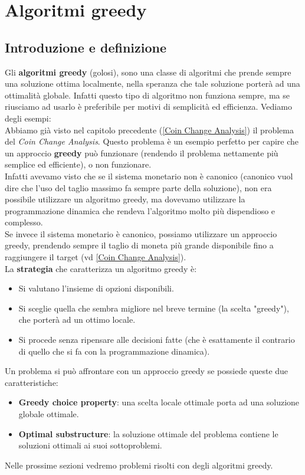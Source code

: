 \chapter{Algoritmi greedy} \label{greedy}
\section{Introduzione e definizione}
Gli \textbf{algoritmi greedy} (golosi), sono una classe di algoritmi che prende sempre una
soluzione ottima localmente, nella speranza che tale soluzione porterà ad una
ottimalità globale. Infatti questo tipo di algoritmo non funziona sempre, ma se 
riusciamo ad usarlo è preferibile per motivi di semplicità ed efficienza. Vediamo degli esempi:\smallskip\\
Abbiamo già visto nel capitolo precedente (\ref{Coin Change Analysis}) il problema del \textit{Coin Change Analysis}.
Questo problema è un esempio perfetto per capire che un approccio \textbf{greedy} può funzionare
(rendendo il problema nettamente più semplice ed efficiente), o non funzionare.\\
Infatti avevamo visto che se il sistema monetario non è canonico (canonico vuol dire che l’uso del taglio massimo fa
sempre parte della soluzione), non era possibile utilizzare un algoritmo greedy, ma dovevamo utilizzare
la programmazione dinamica che rendeva l'algoritmo molto più dispendioso e complesso.\\
Se invece il sistema monetario è canonico, possiamo utilizzare un approccio greedy,
prendendo sempre il taglio di moneta più grande disponibile fino a raggiungere il
target (vd \ref{Coin Change Analysis}).\smallskip\\
La \textbf{strategia} che caratterizza un algoritmo greedy è:
\begin{itemize}
    \item Si valutano l'insieme di opzioni disponibili.
    \item Si sceglie quella che sembra migliore nel breve termine (la scelta "greedy"),
    che porterà ad un ottimo locale.
    \item Si procede senza ripensare alle decisioni fatte (che è esattamente il contrario
    di quello che si fa con la programmazione dinamica).
\end{itemize}
Un problema si può affrontare con un approccio greedy se possiede queste due caratteristiche:
\begin{itemize}
    \item \textbf{Greedy choice property}: una scelta locale ottimale porta ad una soluzione
    globale ottimale.
    \item \textbf{Optimal substructure}: la soluzione ottimale del problema contiene le soluzioni
    ottimali ai suoi sottoproblemi.
\end{itemize}
Nelle prossime sezioni vedremo problemi risolti con degli algoritmi greedy.



